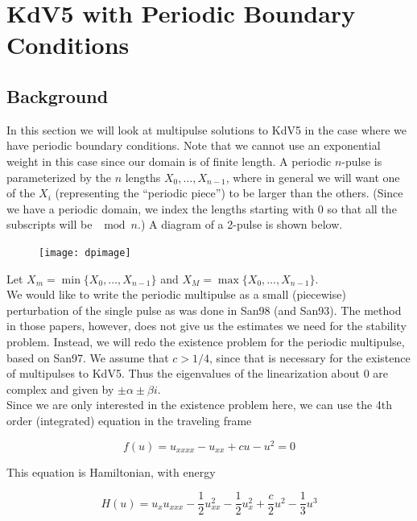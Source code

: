 \documentclass[12pt]{article}
\begin{document}
\section{KdV5 with Periodic Boundary Conditions}

\subsection{Background}

In this section we will look at multipulse solutions to KdV5 in the case where we have periodic boundary conditions. Note that we cannot use an exponential weight in this case since our domain is of finite length. A periodic $n$-pulse is parameterized by the $n$ lengths $X_0, \dots, X_{n-1}$, where in general we will want one of the $X_i$ (representing the ``periodic piece'') to be larger than the others. (Since we have a periodic domain, we index the lengths starting with $0$ so that all the subscripts will be $\mod n$.) A diagram of a 2-pulse is shown below.

\begin{figure}[H]
\texttt{[image: dpimage]}
\end{figure}

Let $X_m = \min \{ X_0, \dots, X_{n-1} \}$ and $X_M = \max \{ X_0, \dots, X_{n-1} \}$.\\

We would like to write the periodic multipulse as a small (piecewise) perturbation of the single pulse as was done in San98 (and San93). The method in those papers, however, does not give us the estimates we need for the stability problem. Instead, we will redo the existence problem for the periodic multipulse, based on San97. We assume that $c > 1/4$, since that is necessary for the existence of multipulses to KdV5. Thus the eigenvalues of the linearization about $0$ are complex and given by $\pm \alpha \pm \beta i$.\\

Since we are only interested in the existence problem here, we can use the 4th order (integrated) equation in the traveling frame

\begin{equation}\label{4thorder}
f(u) = u_{xxxx} - u_{xx} + c u - u^2 = 0
\end{equation}

This equation is Hamiltonian, with energy 

\begin{equation}\label{4thorderE}
H(u) = u_x u_{xxx} - \frac{1}{2}u_{xx}^2 - \frac{1}{2}u_x^2 + \frac{c}{2}u^2 - \frac{1}{3}u^3
\end{equation}
\end{document}
